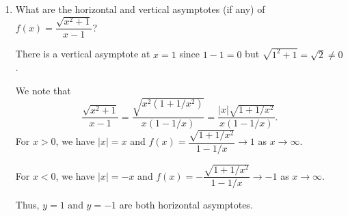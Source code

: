 \documentclass[12pt]{article}
\newcommand{\points}[1]{\marginpar{\hspace{24pt}[#1]}}
\newcommand{\abs}[1]{\lvert #1\rvert}
\begin{document}
\begin{enumerate}
\item What are the horizontal and vertical asymptotes (if any) of $f(x) = \dfrac{\sqrt{x^2+1}}{x-1}$?\points{2}

\bigskip

There is a vertical asymptote at $x=1$ since $1-1=0$ but $\sqrt{1^2+1} =\sqrt{2}\neq 0$.

We note that
\[
 \dfrac{\sqrt{x^2+1}}{x-1} = \dfrac{\sqrt{x^2(1+1/x^2)}}{x(1-1/x)} = \dfrac{\abs{x}\sqrt{1+1/x^2}}{x(1-1/x)}.
\]
For $x>0$, we have $\abs{x}=x$ and $f(x)=\dfrac{\sqrt{1+1/x^2}}{1-1/x}\to 1$ as $x\to \infty$.

For $x<0$, we have $\abs{x}=-x$ and $f(x) = -\dfrac{\sqrt{1+1/x^2}}{1-1/x}\to -1$ as $x\to \infty$.

Thus, $y=1$ and $y=-1$ are both horizontal asymptotes.
\end{enumerate}
\end{document}
